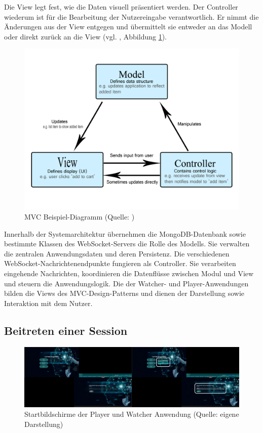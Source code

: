 Die View legt fest, wie die Daten visuell präsentiert werden. Der Controller wiederum ist für die Bearbeitung der Nutzereingabe verantwortlich. Er nimmt die Änderungen aus der View entgegen und übermittelt sie entweder an das Modell oder direkt zurück an die View (vgl. \citealp{noauthor_mvc_2023}, Abbildung \ref{fig:mvc-diagramm}).

\begin{figure}[ht]
\centering
\includegraphics[width=1\linewidth]{content/pictures/mvc-architecture.png}
\caption{\ac{MVC} Beispiel-Diagramm (Quelle: \cite{noauthor_mvc_2023})}
\label{fig:mvc-diagramm}
\end{figure}

Innerhalb der Systemarchitektur übernehmen die MongoDB-Datenbank sowie bestimmte Klassen des WebSocket-Servers die Rolle des Modells. Sie verwalten die zentralen Anwendungsdaten und deren Persistenz. Die verschiedenen WebSocket-Nachrichtenendpunkte fungieren als Controller. Sie verarbeiten eingehende Nachrichten, koordinieren die Datenflüsse zwischen Modul und View und steuern die Anwendungslogik. Die  der Watcher- und Player-Anwendungen bilden die Views des \ac{MVC}-Design-Patterns und dienen der Darstellung sowie Interaktion mit dem Nutzer.

\subsection{Beitreten einer Session}

\begin{figure}[ht]
\centering
\includegraphics[width=1\linewidth]{content/pictures/Login_Login_by_ID.png}
\caption{Startbildschirme der Player und Watcher Anwendung (Quelle: eigene Darstellung)}
\label{fig:old-logins}
\end{figure}

